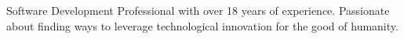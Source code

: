 

\begin{cvparagraph}

Software Development Professional with over 18 years of experience. Passionate about finding ways to leverage technological innovation for the good of humanity.
\end{cvparagraph}
